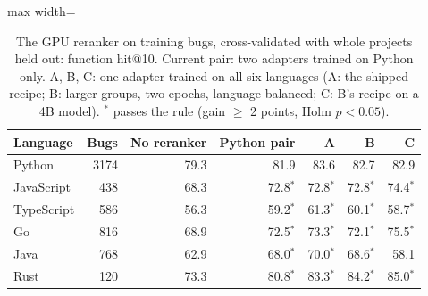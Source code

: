 \begin{table}[t]
\centering
\small
\caption{The GPU reranker on training bugs, cross-validated with whole projects held out: function hit@10. Current pair: two adapters trained on Python only. A, B, C: one adapter trained on all six languages (A: the shipped recipe; B: larger groups, two epochs, language-balanced; C: B's recipe on a 4B model). $^*$ passes the rule (gain $\geq$ 2 points, Holm $p<0.05$).}
\label{tab:reranker}
\begin{adjustbox}{max width=\linewidth}\begin{tabular}{lrrrrrr}
\toprule
Language & Bugs & No reranker & Python pair & A & B & C \\
\midrule
Python & 3174 & 79.3 & 81.9 & 83.6 & 82.7 & 82.9 \\
JavaScript & 438 & 68.3 & 72.8$^*$ & 72.8$^*$ & 72.8$^*$ & 74.4$^*$ \\
TypeScript & 586 & 56.3 & 59.2$^*$ & 61.3$^*$ & 60.1$^*$ & 58.7$^*$ \\
Go & 816 & 68.9 & 72.5$^*$ & 73.3$^*$ & 72.1$^*$ & 75.5$^*$ \\
Java & 768 & 62.9 & 68.0$^*$ & 70.0$^*$ & 68.6$^*$ & 58.1 \\
Rust & 120 & 73.3 & 80.8$^*$ & 83.3$^*$ & 84.2$^*$ & 85.0$^*$ \\
\bottomrule
\end{tabular}\end{adjustbox}
\end{table}
